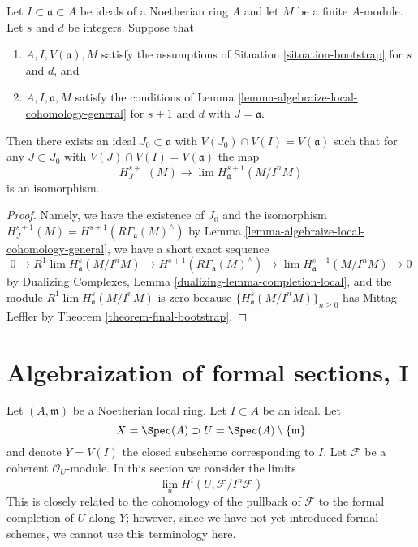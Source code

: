 \begin{lemma}
\label{lemma-combine-two}
Let $I \subset \mathfrak a \subset A$ be ideals of a Noetherian ring $A$
and let $M$ be a finite $A$-module. Let $s$ and $d$ be integers.
Suppose that
\begin{enumerate}
\item $A, I, V(\mathfrak a), M$ satisfy the assumptions of
Situation \ref{situation-bootstrap} for $s$ and $d$, and
\item $A, I, \mathfrak a, M$ satisfy the conditions of
Lemma \ref{lemma-algebraize-local-cohomology-general}
for $s + 1$ and $d$ with $J = \mathfrak a$.
\end{enumerate}
Then there exists an ideal
$J_0 \subset \mathfrak a$ with $V(J_0) \cap V(I) = V(\mathfrak a)$
such that for any $J \subset J_0$ with $V(J) \cap V(I) = V(\mathfrak a)$
the map
$$
H^{s + 1}_J(M) \longrightarrow \lim H^{s + 1}_\mathfrak a(M/I^nM)
$$
is an isomorphism.
\end{lemma}

\begin{proof}
Namely, we have the existence of $J_0$
and the isomorphism
$H^{s + 1}_J(M) = H^{s + 1}(R\Gamma_\mathfrak a(M)^\wedge)$
by Lemma \ref{lemma-algebraize-local-cohomology-general},
we have a short exact sequence
$$
0 \to R^1\lim H^s_\mathfrak a(M/I^nM) \to
H^{s + 1}(R\Gamma_\mathfrak a(M)^\wedge) \to
\lim H^{s + 1}_\mathfrak a(M/I^nM) \to 0
$$
by Dualizing Complexes, Lemma \ref{dualizing-lemma-completion-local},
and the module $R^1\lim H^s_\mathfrak a(M/I^nM)$ is zero because
$\{H^s_\mathfrak a(M/I^nM)\}_{n \geq 0}$ has Mittag-Leffler
by Theorem \ref{theorem-final-bootstrap}.
\end{proof}








\section{Algebraization of formal sections, I}
\label{section-algebraization-sections}

\noindent
Let $(A, \mathfrak m)$ be a Noetherian local ring.
Let $I \subset A$ be an ideal. Let
$$
X = \Spec(A) \supset U = \Spec(A) \setminus \{\mathfrak m\}
$$
and denote $Y = V(I)$ the closed subscheme corresponding to $I$.
Let $\mathcal{F}$ be a coherent $\mathcal{O}_U$-module.
In this section we consider the limits
$$
\lim_n H^i(U, \mathcal{F}/I^n\mathcal{F})
$$
This is closely related to the cohomology of the pullback
of $\mathcal{F}$ to the formal completion of $U$ along $Y$;
however, since we have not yet introduced formal schemes,
we cannot use this terminology here.

